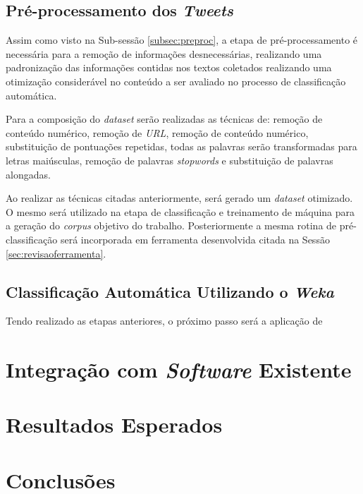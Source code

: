 \subsection{Pré-processamento dos \textit{Tweets}}
Assim como visto na Sub-sessão \ref{subsec:preproc}, a etapa de pré-processamento é necessária para a remoção de informações desnecessárias, realizando uma padronização das informações contidas nos textos coletados realizando uma otimização considerável no conteúdo a ser avaliado no processo de classificação automática. 

Para a composição do \textit{dataset} serão realizadas as técnicas de: remoção de conteúdo numérico, remoção de \textit{URL}, remoção de conteúdo numérico, substituição de pontuações repetidas, todas as palavras serão transformadas para letras maiúsculas, remoção de palavras \textit{stopwords} e substituição de palavras alongadas. 

Ao realizar as técnicas citadas anteriormente, será gerado um \textit{dataset} otimizado. O mesmo será utilizado na etapa de classificação e treinamento de máquina para a geração do \textit{corpus} objetivo do trabalho. Posteriormente a mesma rotina de pré-classificação será incorporada em ferramenta desenvolvida citada na Sessão \ref{sec:revisaoferramenta}.

\subsection{Classificação Automática Utilizando o \textit{Weka}}
Tendo realizado as etapas anteriores, o próximo passo será a aplicação de 

\section{Integração com \textit{Software} Existente}
\section{Resultados Esperados}
\section{Conclusões}

